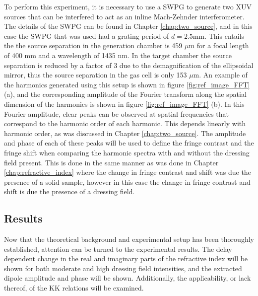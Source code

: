 To perform this experiment, it is necessary to use a SWPG to generate two XUV sources that can be interfered to act as an inline Mach-Zehnder interferometer.  The details of the SWPG can be found in Chapter \ref{chap:two_source}, and in this case the SWPG that was used had a grating period of $d=2.5$mm.  This entails the the source separation in the generation chamber is 459 $\mu$m for a focal length of 400 mm and a wavelength of 1435 nm.  In the target chamber the source separation is reduced by a factor of 3 due to the demagnification of the ellipsoidal mirror, thus the source separation in the gas cell is only 153 $\mu$m.  An example of the harmonics generated using this setup is shown in figure \ref{fig:ref_image_FFT} (a), and the corresponding amplitude of the Fourier transform along the spatial dimension of the harmonics is shown in figure \ref{fig:ref_image_FFT} (b).  In this Fourier amplitude, clear peaks can be observed at spatial frequencies that correspond to the harmonic order of each harmonic.  This depends linearly with harmonic order, as was discussed in Chapter \ref{chap:two_source}.  The amplitude and phase of each of these peaks will be used to define the fringe contrast and the fringe shift when comparing the harmonic spectra with and without the dressing field present.  This is done in the same manner as was done in Chapter \ref{chap:refractive_index} where the change in fringe contrast and shift was due the presence of a solid sample, however in this case the change in fringe contrast and shift is due the presence of a dressing field. 

\subsection{Results}
\label{sec:CATS_ar_results}

Now that the theoretical background and experimental setup has been thoroughly established, attention can be turned to the experimental results.  The delay dependent change in the real and imaginary parts of the refractive index will be shown for both moderate and high dressing field intensities, and the extracted dipole amplitude and phase will be shown. Additionally, the applicability, or lack thereof, of the KK relations will be examined.

